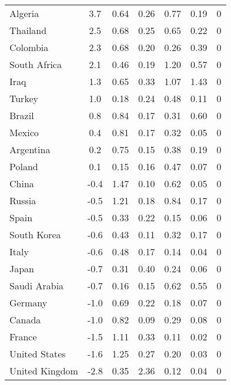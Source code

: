 \begin{tabular}[t]{lcccccc}
Algeria & 3.7 & 0.64 & 0.26 & 0.77 & 0.19 & 0\\
Thailand & 2.5 & 0.68 & 0.25 & 0.65 & 0.22 & 0\\
Colombia & 2.3 & 0.68 & 0.20 & 0.26 & 0.39 & 0\\
South Africa & 2.1 & 0.46 & 0.19 & 1.20 & 0.57 & 0\\
Iraq & 1.3 & 0.65 & 0.33 & 1.07 & 1.43 & 0\\
Turkey & 1.0 & 0.18 & 0.24 & 0.48 & 0.11 & 0\\
Brazil & 0.8 & 0.84 & 0.17 & 0.31 & 0.60 & 0\\
Mexico & 0.4 & 0.81 & 0.17 & 0.32 & 0.05 & 0\\
Argentina & 0.2 & 0.75 & 0.15 & 0.38 & 0.19 & 0\\
Poland & 0.1 & 0.15 & 0.16 & 0.47 & 0.07 & 0\\
China & -0.4 & 1.47 & 0.10 & 0.62 & 0.05 & 0\\
Russia & -0.5 & 1.21 & 0.18 & 0.84 & 0.17 & 0\\
Spain & -0.5 & 0.33 & 0.22 & 0.15 & 0.06 & 0\\
South Korea & -0.6 & 0.43 & 0.11 & 0.32 & 0.17 & 0\\
Italy & -0.6 & 0.48 & 0.17 & 0.14 & 0.04 & 0\\
Japan & -0.7 & 0.31 & 0.40 & 0.24 & 0.06 & 0\\
Saudi Arabia & -0.7 & 0.16 & 0.15 & 0.62 & 0.55 & 0\\
Germany & -1.0 & 0.69 & 0.22 & 0.18 & 0.07 & 0\\
Canada & -1.0 & 0.82 & 0.09 & 0.29 & 0.08 & 0\\
France & -1.5 & 1.11 & 0.33 & 0.11 & 0.02 & 0\\
United States & -1.6 & 1.25 & 0.27 & 0.20 & 0.03 & 0\\
United Kingdom & -2.8 & 0.35 & 2.36 & 0.12 & 0.04 & 0\\
\bottomrule
\end{tabular}